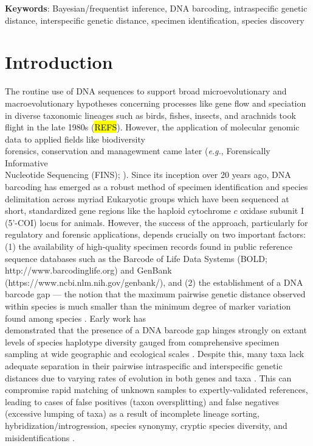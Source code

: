 \documentclass[12pt]{article}
\begin{document}
\textbf{Keywords}: Bayesian/frequentist inference, DNA barcoding, intraspecific genetic \\ distance, interspecific genetic distance, specimen identification, species discovery

\vspace{2mm}

\section{Introduction}

The routine use of DNA sequences to support broad microevolutionary and \\ macroevolutionary hypotheses concerning processes like gene flow and speciation in diverse taxonomic lineages such as birds, fishes, insects, and arachnids took flight in the late 1980s (\hl{REFS}). However, the application of molecular genomic data to applied fields like biodiversity \\ forensics, conservation and managewment came later (\textit{e.g.}, Forensically Informative \\ Nucleotide Sequencing (FINS); \citet{bartlett1992fins}). Since its inception over 20 years ago, DNA barcoding \citep{hebert2003biological, hebert2003barcoding} has emerged as a robust method of specimen identification and species delimitation across myriad Eukaryotic groups which have been sequenced at short, standardized gene regions like the haploid cytochrome $c$ oxidase subunit I (5'-COI) locus for animals. However, the success of the approach, particularly for regulatory and forensic applications, depends crucially on two important factors: (1) the availability of high-quality specimen records found in public reference sequence databases such as the Barcode of Life Data Systems (BOLD; http://www.barcodinglife.org) \citep{ratnasingham2007bold} and GenBank (https://www.ncbi.nlm.nih.gov/genbank/), and (2) the establishment of a DNA barcode gap --- the notion that the maximum pairwise genetic distance observed within species is much smaller than the minimum degree of marker variation found among species \citep{meyer2005dna, meier2008use}. Early work has \\ demonstrated that the presence of a DNA barcode gap hinges strongly on extant levels of species haplotype diversity gauged from comprehensive specimen sampling at wide geographic and ecological scales \citep{bergsten2012effect, candek2015dna}. Despite this, many taxa lack adequate separation in their pairwise intraspecific and interspecific genetic distances due to varying rates of evolution in both genes and taxa \citep{pentinsaari2016molecular}. This can compromise rapid matching of unknown samples to expertly-validated references, leading to cases of false positives (taxon oversplitting) and false negatives (excessive lumping of taxa) as a result of incomplete lineage sorting, hybridization/introgression, species synonymy, cryptic species diversity, and misidentifications \citep{hubert2015dna, phillips2022lack}.
\end{document}
